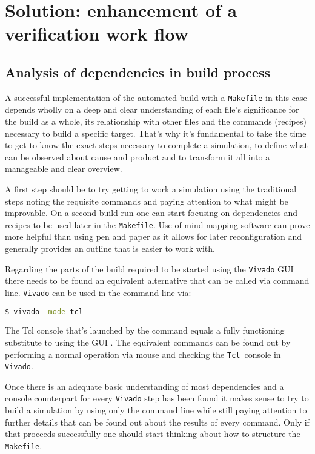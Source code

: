 
\chapter{Solution: enhancement of a verification work flow}

\section{Analysis of dependencies in build process}

A successful implementation of the automated build with a \texttt{Makefile} in this case depends wholly on a deep and clear understanding of each file's significance for the build as a whole, its relationship with other files and the commands (recipes) necessary to build a specific target. That's why it's fundamental to take the time to get to know the exact steps necessary to complete a simulation, to define what can be observed about cause and product and to transform it all into a manageable and clear overview.

A first step should be to try getting to work a simulation using the traditional steps noting the requisite commands and paying attention to what might be improvable. On a second build run one can start focusing on dependencies and recipes to be used later in the \texttt{Makefile}. Use of mind mapping software can prove more helpful than using pen and paper as it allows for later reconfiguration and generally provides an outline that is easier to work with.

Regarding the parts of the build required to be started using the \texttt{Vivado} \acs{GUI} there needs to be found an equivalent alternative that can be called via command line. \texttt{Vivado} can be used in the command line via:

\begin{lstlisting}[language=bash]
$ vivado -mode tcl
\end{lstlisting}
The Tcl console that's launched by the command equals a fully functioning substitute to using the \acs{GUI} \cite[p. 154]{Xi18}. The equivalent commands can be found out by performing a normal operation via mouse and checking the \texttt{Tcl }console in \texttt{Vivado}.

Once there is an adequate basic understanding of most dependencies and a console counterpart for every \texttt{Vivado} step has been found it makes sense to try to build a simulation by using only the command line while still paying attention to further details that can be found out about the results of every command. Only if that proceeds successfully one should start thinking about how to structure the \texttt{Makefile}. 

